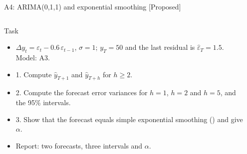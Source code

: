 \begin{frame}{A4: ARIMA(0,1,1) and exponential smoothing [Proposed]}
\propsub
\itemsize{\scriptsize}
\begin{columns}[T]
\begin{column}{\taskw}
\begin{block}{Task}
\begin{itemize}
    \item $\Delta y_t = \varepsilon_t - 0.6\,\varepsilon_{t-1}$, $\sigma = 1$; $y_T = 50$ and the last residual is $\hat\varepsilon_T = 1.5$. Model: A3.
    \item 1. Compute $\hat y_{T+1}$ and $\hat y_{T+h}$ for $h \ge 2$.
    \item 2. Compute the forecast error variances for $h = 1$, $h = 2$ and $h = 5$, and the 95\% intervals.
    \item 3. Show that the forecast equals simple exponential smoothing () and give $\alpha$.
    \item Report: two forecasts, three intervals and $\alpha$.
\end{itemize}
\end{block}
\end{column}
\begin{column}{\solw}
\end{column}
\end{columns}
\end{frame}

